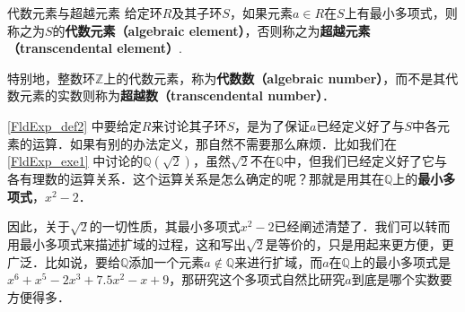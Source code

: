 \begin{definition}{代数元素与超越元素}\label{FldExp_def2}
给定环$R$及其子环$S$，如果元素$a\in R$在$S$上有最小多项式，则称之为$S$的\textbf{代数元素（algebraic element）}，否则称之为\textbf{超越元素（transcendental element）}.

特别地，整数环$\mathbb{Z}$上的代数元素，称为\textbf{代数数（algebraic number）}，而不是其代数元素的实数则称为\textbf{超越数（transcendental number）}．
\end{definition}

\autoref{FldExp_def2} 中要给定$R$来讨论其子环$S$，是为了保证$a$已经定义好了与$S$中各元素的运算．如果有别的办法定义，那自然不需要那么麻烦．比如我们在\autoref{FldExp_exe1} 中讨论的$\mathbb{Q}(\sqrt{2})$，虽然$\sqrt{2}$不在$\mathbb{Q}$中，但我们已经定义好了它与各有理数的运算关系．这个运算关系是怎么确定的呢？那就是用其在$\mathbb{Q}$上的\textbf{最小多项式}，$x^2-2$．







因此，关于$\sqrt{2}$的一切性质，其最小多项式$x^2-2$已经阐述清楚了．我们可以转而用最小多项式来描述扩域的过程，这和写出$\sqrt{2}$是等价的，只是用起来更方便，更广泛．比如说，要给$\mathbb{Q}$添加一个元素$a\not\in \mathbb{Q}$来进行扩域，而$a$在$\mathbb{Q}$上的最小多项式是$x^6+x^5-2x^3+7.5x^2-x+9$，那研究这个多项式自然比研究$a$到底是哪个实数要方便得多．






